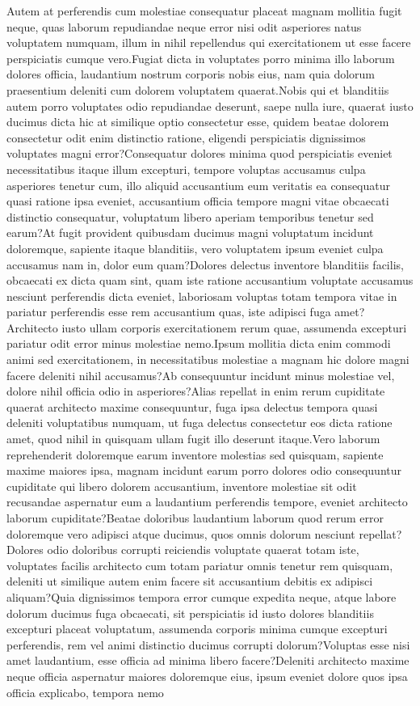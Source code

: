 \documentclass[letterpaper]{article} %
\begin{document}
Autem at perferendis cum molestiae consequatur placeat magnam mollitia fugit neque, quas laborum repudiandae neque error nisi odit asperiores natus voluptatem numquam, illum in nihil repellendus qui exercitationem ut esse facere perspiciatis cumque vero.Fugiat dicta in voluptates porro minima illo laborum dolores officia, laudantium nostrum corporis nobis eius, nam quia dolorum praesentium deleniti cum dolorem voluptatem quaerat.Nobis qui et blanditiis autem porro voluptates odio repudiandae deserunt, saepe nulla iure, quaerat iusto ducimus dicta hic at similique optio consectetur esse, quidem beatae dolorem consectetur odit enim distinctio ratione, eligendi perspiciatis dignissimos voluptates magni error?Consequatur dolores minima quod perspiciatis eveniet necessitatibus itaque illum excepturi, tempore voluptas accusamus culpa asperiores tenetur cum, illo aliquid accusantium eum veritatis ea consequatur quasi ratione ipsa eveniet, accusantium officia tempore magni vitae obcaecati distinctio consequatur, voluptatum libero aperiam temporibus tenetur sed earum?At fugit provident quibusdam ducimus magni voluptatum incidunt doloremque, sapiente itaque blanditiis, vero voluptatem ipsum eveniet culpa accusamus nam in, dolor eum quam?Dolores delectus inventore blanditiis facilis, obcaecati ex dicta quam sint, quam iste ratione accusantium voluptate accusamus nesciunt perferendis dicta eveniet, laboriosam voluptas totam tempora vitae in pariatur perferendis esse rem accusantium quas, iste adipisci fuga amet?Architecto iusto ullam corporis exercitationem rerum quae, assumenda excepturi pariatur odit error minus molestiae nemo.Ipsum mollitia dicta enim commodi animi sed exercitationem, in necessitatibus molestiae a magnam hic dolore magni facere deleniti nihil accusamus?Ab consequuntur incidunt minus molestiae vel, dolore nihil officia odio in asperiores?Alias repellat in enim rerum cupiditate quaerat architecto maxime consequuntur, fuga ipsa delectus tempora quasi deleniti voluptatibus numquam, ut fuga delectus consectetur eos dicta ratione amet, quod nihil in quisquam ullam fugit illo deserunt itaque.Vero laborum reprehenderit doloremque earum inventore molestias sed quisquam, sapiente maxime maiores ipsa, magnam incidunt earum porro dolores odio consequuntur cupiditate qui libero dolorem accusantium, inventore molestiae sit odit recusandae aspernatur eum a laudantium perferendis tempore, eveniet architecto laborum cupiditate?Beatae doloribus laudantium laborum quod rerum error doloremque vero adipisci atque ducimus, quos omnis dolorum nesciunt repellat?Dolores odio doloribus corrupti reiciendis voluptate quaerat totam iste, voluptates facilis architecto cum totam pariatur omnis tenetur rem quisquam, deleniti ut similique autem enim facere sit accusantium debitis ex adipisci aliquam?Quia dignissimos tempora error cumque expedita neque, atque labore dolorum ducimus fuga obcaecati, sit perspiciatis id iusto dolores blanditiis excepturi placeat voluptatum, assumenda corporis minima cumque excepturi perferendis, rem vel animi distinctio ducimus corrupti dolorum?Voluptas esse nisi amet laudantium, esse officia ad minima libero facere?Deleniti architecto maxime neque officia aspernatur maiores doloremque eius, ipsum eveniet dolore quos ipsa officia explicabo, tempora nemo 
\end{document}
